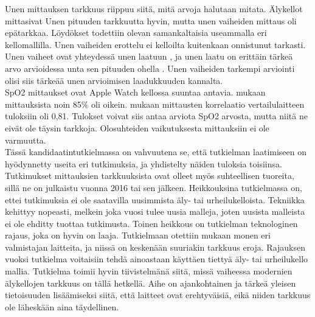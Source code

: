 \documentclass[utf8,bachelor,finnish]{bachelor}
\begin{document}
Unen mittauksen tarkkuus riippuu siitä, mitä arvoja halutaan mitata. Älykellot mittasivat Unen pituuden tarkkuutta hyvin, mutta unen vaiheiden mittaus oli epätarkkaa.
 Löydökset todettiin olevan samankaltaisia useammalla eri kellomallilla. 
 Unen vaiheiden erottelu ei kelloilta kuitenkaan onnistunut tarkasti. Unen vaiheet ovat yhteydessä unen laatuun \parencite{krystal_measuring_2008},
  ja unen laatu on erittäin tärkeä arvo arvioidessa unta sen pituuden ohella \parencite{kohyama_which_2021}. Unen vaiheiden
   tarkempi arviointi olisi siis tärkeää unen arvioimisen laadukkuuden kannalta.\\
  
SpO2 mittaukset ovat Apple Watch kellossa suuntaa antavia.
 \textcite{patz_accuracy_2023} mukaan mittauksista noin 85\% oli oikein. \textcite{pipek_comparison_2021} mukaan mittausten korrelaatio vertailulaitteen tuloksiin oli 0,81.
   Tulokset voivat siis antaa arviota SpO2 arvosta, mutta niitä ne eivät ole täysin tarkkoja. Olosuhteiden vaikutuksesta mittauksiin ei ole varmuutta.\\

Tässä kandidaatintutkielmassa on vahvuutena se, että tutkielman laatimiseen on hyödynnetty useita eri tutkimuksia, ja yhdistelty näiden tuloksia toisiinsa.
 Tutkimukset mittauksien tarkkuuksista ovat olleet myös suhteellisen tuoreita, sillä ne on julkaistu vuonna 2016 tai sen jälkeen.
  Heikkouksina tutkielmassa on, ettei tutkimuksia ei ole saatavilla uusimmista äly- tai urheilukelloista. Tekniikka kehittyy nopeasti,
  melkein joka vuosi tulee uusia malleja, joten uusista malleista ei ole ehditty tuottaa tutkimusta.
     Toinen heikkous on tutkielman teknologinen rajaus, joka on hyvin on laaja. Tutkielmaan otettiin mukaan monen eri valmistajan laitteita, ja niissä
      on keskenään suuriakin tarkkuus eroja. Rajauksen vuoksi tutkielma voitaisiin tehdä ainoastaan käyttäen tiettyä äly- tai urheilukello mallia.
       Tutkielma toimii hyvin tiivistelmänä siitä, missä vaiheessa modernien älykellojen tarkkuus on tällä hetkellä. Aihe on ajankohtainen
        ja tärkeä yleisen tietoisuuden lisäämiseksi siitä, että laitteet ovat erehtyväisiä, eikä niiden tarkkuus ole läheskään aina täydellinen.





\printbibliography
\end{document}

